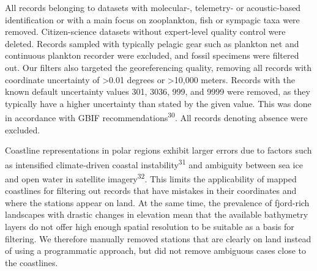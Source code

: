\documentclass[
  letterpaper,
  DIV=11,
  numbers=noendperiod]{scrartcl}
\begin{document}
All records belonging to datasets with molecular-, telemetry- or
acoustic-based identification or with a main focus on zooplankton, fish
or sympagic taxa were removed. Citizen-science datasets without
expert-level quality control were deleted. Records sampled with
typically pelagic gear such as plankton net and continuous plankton
recorder were excluded, and fossil specimens were filtered out. Our
filters also targeted the georeferencing quality, removing all records
with coordinate uncertainty of \textgreater0.01 degrees or
\textgreater10,000 meters. Records with the known default uncertainty
values 301, 3036, 999, and 9999 were removed, as they typically have a
higher uncertainty than stated by the given value. This was done in
accordance with GBIF recommendations\textsuperscript{30}. All records
denoting absence were excluded.

Coastline representations in polar regions exhibit larger errors due to
factors such as intensified climate‑driven coastal
instability\textsuperscript{31} and ambiguity between sea ice and open
water in satellite imagery\textsuperscript{32}. This limits the
applicability of mapped coastlines for filtering out records that have
mistakes in their coordinates and where the stations appear on land. At
the same time, the prevalence of fjord-rich landscapes with drastic
changes in elevation mean that the available bathymetry layers do not
offer high enough spatial resolution to be suitable as a basis for
filtering. We therefore manually removed stations that are clearly on
land instead of using a programmatic approach, but did not remove
ambiguous cases close to the coastlines.
\end{document}
